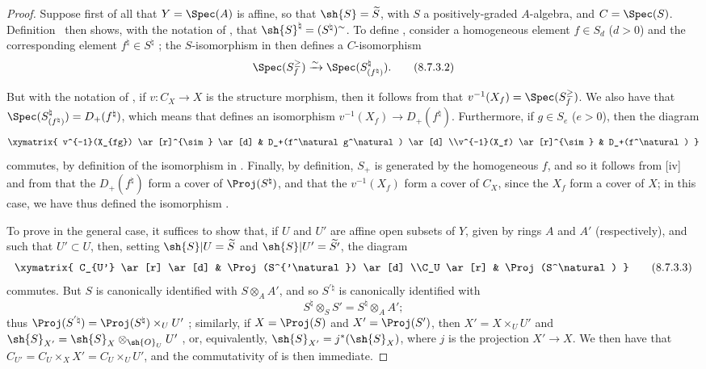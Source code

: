 \begin{proof}
Suppose first of all that $Y=\Spec(A)$ is affine, so that $\sh{S}=\widetilde{S}$, with $S$ a positively-graded $A$-algebra, and $C=\Spec(S)$.
Definition~ then shows, with the notation of , that $\sh{S}^\natural=(S^\natural)^\sim$.
To define , consider a homogeneous element $f\in S_d$ ($d>0$) and the corresponding element $f^\natural\in S^\natural$ ;
the $S$-isomorphism in  then defines a $C$-isomorphism
\[
\label{II.8.7.3.2}
  \Spec(S_f^\geq) \xrightarrow{\sim} \Spec(S_{(f^\natural)}^\natural).
\tag{8.7.3.2}
\]

But with the notation of , if $v:C_X\to X$ is the structure morphism, then it follows from  that $v^{-1}(X_f)=\Spec(S_f^\geq)$.
We also have that $\Spec(S_{(f^\natural)}^\natural)=D_+(f^\natural)$, which means that  defines an isomorphism $v^{-1}(X_f)\to D_+(f^\natural)$.
Furthermore, if $g\in S_e$ ($e>0$), then the diagram
\[
  \xymatrix{
    v^{-1}(X_{fg})
      \ar[r]^{\sim}
      \ar[d]
  & D_+(f^\natural g^\natural)
      \ar[d]
  \\v^{-1}(X_f)
      \ar[r]^{\sim}
  & D_+(f^\natural)
  }
\]
commutes, by definition of the isomorphism in .
Finally, by definition, $S_+$ is generated by the homogeneous $f$, and so it follows from [iv] and from  that the $D_+(f^\natural)$ form a cover of $\Proj(S^\natural)$, and that the $v^{-1}(X_f)$ form a cover of $C_X$, since the $X_f$ form a cover of $X$;
in this case, we have thus defined the isomorphism .

To prove  in the general case, it suffices to show that, if $U$ and $U'$ are affine open subsets of $Y$, given by rings $A$ and $A'$ (respectively), and such that $U'\subset U$, then, setting $\sh{S}|U=\widetilde{S}$ and $\sh{S}|U'=\widetilde{S'}$, the diagram
\[
\label{II.8.7.3.3}
  \xymatrix{
    C_{U'}
      \ar[r]
      \ar[d]
  & \Proj(S^{'\natural})
      \ar[d]
  \\C_U
      \ar[r]
  & \Proj(S^\natural)
  }
\tag{8.7.3.3}
\]
commutes.
But $S$ is canonically identified with $S\otimes_A A'$, and so $S^{'\natural}$ is canonically identified with
\[
  S^\natural \otimes_S S' = S^\natural \otimes_A A';
\]
thus $\Proj(S^{'\natural}) = \Proj(S^\natural)\times_U U'$ ;
similarly, if $X=\Proj(S)$ and $X'=\Proj(S')$, then $X'=X\times_U U'$ and $\sh{S}_{X'}=\sh{S}_X\otimes_{\sh{O}_U}U'$ , or, equivalently, $\sh{S}_{X'}=j^*(\sh{S}_X)$, where $j$ is the projection $X'\to X$.
We then  have that $C_{U'} = C_U\times_X X' = C_U\times_U U'$, and the commutativity of  is then immediate.
\end{proof}

